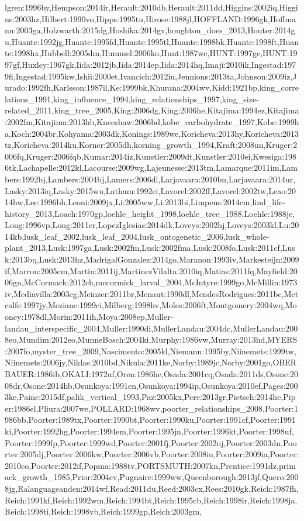 \documentclass[10pt,twoside]{article}\usepackage[]{graphicx}\usepackage[]{color}
\begin{document}
lgren:1996by,Hempson:2014ir,Herault:2010db,Herault:2011dd,Higgins:2002iq,Higgins:2003hz,Hilbert:1990vo,Hipps:1995tu,Hirose:1988jl,HOFFLAND:1996gk,Hoffmann:2003ga,Holzwarth:2015dg,Hoshika:2014gv,houghton_does_2013,Houter:2014gu,Huante:1992jg,Huante:1995fd,Huante:1995tl,Huante:1998bk,Huante:1998ft,Huante:1998hx,Hubbell:2005dm,Hummel:2006ko,Hunt:1987wc,HUNT:1997ge,HUNT:1997gf,Huxley:1967gk,Iida:2012jb,Iida:2014ep,Iida:2014hq,Imaji:2010ik,Ingestad:1979fi,Ingestad:1995kw,Ishii:2000et,Ivancich:2012iu,Jennions:2013ta,Johnson:2009iz,Jurado:1992fh,Karlsson:1987il,Ke:1999bk,Khurana:2004wv,Kidd:1921bp,king_correlations_1991,king_influence_1994,king_relationships_1997,king_size-related_2011,king_tree_2005,King:2006dg,King:2006he,Kitajima:1994ez,Kitajima:2002fm,Kitajima:2013hb,Kneeshaw:2006bd,kobe_carbohydrate_1997,Kobe:1999ha,Koch:2004br,Kohyama:2003dk,Konings:1989we,Koricheva:2013hy,Koricheva:2013tz,Koricheva:2014ku,Korner:2005dh,korning_growth_1994,Kraft:2008un,Kruger:2006fq,Kruger:2006fqb,Kumar:2014iz,Kunstler:2009dt,Kunstler:2010ei,Kwesiga:1986tk,Lachapelle:2012kl,Lacourse:2009wg,Lajeunesse:2013tm,Lamarque:2011im,Lambers:1992bj,Lambers:2004bj,Lamers:2006dl,Larjavaara:2010bn,Larjavaara:2014ur,Lasky:2013iq,Lasky:2015wu,Latham:1992ei,Lavorel:2002ff,Lavorel:2002tw,Leao:2014hw,Lee:1996bh,Leoni:2009jx,Li:2005ww,Li:2013bi,Limpens:2014cm,lind_life-history_2013,Loach:1970gp,loehle_height_1998,loehle_tree_1988,Loehle:1988je,Long:1996vp,Long:2011er,LopezIglesias:2014dk,Loveys:2002hj,Loveys:2003kl,Lu:2014kb,lusk_leaf_2002,lusk_leaf_2004,lusk_ontogenetic_2006,lusk_whole-plant_2013,Lusk:1997ga,Lusk:2002fm,Lusk:2002fma,Lusk:2008fo,Lusk:2011cf,Lusk:2013bq,Lusk:2013hz,MadrigalGonzalez:2014go,Maranon:1993iv,Markesteijn:2009if,Marron:2005cm,Martin:2011ij,MartinezVilalta:2010iq,Matias:2011fq,Mayfield:2006gn,McCormack:2012ch,mccormick_larval_2004,McIntyre:1999go,McMillin:1973iv,Mediavilla:2003cg,Meinzer:2011br,Menaut:1990dl,MendesRodrigues:2011bc,Metcalfe:1997jy,Meziane:1999ci,Milberg:1998hv,Moles:2006ft,Montgomery:2004wq,Mooney:1978dl,Morin:2011ih,Moya:2008ep,Muller-landau_interspecific_2004,Muller:1990di,MullerLandau:2004dc,MullerLandau:2008eo,Mundim:2012eo,MunneBosch:2004ki,Murphy:1986vw,Murray:2013hd,MYERS:2007fo,myster_tree_2009,Nascimento:2005kl,Niemann:1995by,Niinemets:1999tw,Niinemets:2006jy,Niklas:2010bd,Nikula:2011ke,Norby:1989jc,Norby:2001go,OBERBAUER:1986ib,OKALI:1972uf,Oren:1986he,Osada:2001cq,Osada:2011ds,Osone:2008dr,Osone:2014hb,Osunkoya:1991en,Osunkoya:1994ip,Osunkoya:2010ef,Pages:2003ke,Paine:2015df,palik_vertical_1993,Paz:2005kx,Pere:2013gr,Pietsch:2014he,Piper:1986el,Pliura:2007we,POLLARD:1968wv,poorter_relationships_2008,Poorter:1986bb,Poorter:1989tx,Poorter:1990bt,Poorter:1990ku,Poorter:1991cf,Poorter:1991ki,Poorter:1992hg,Poorter:1994em,Poorter:1995jn,Poorter:1996kt,Poorter:1998uf,Poorter:1999fp,Poorter:1999wd,Poorter:2001fj,Poorter:2002uj,Poorter:2003dn,Poorter:2005dj,Poorter:2006kw,Poorter:2006vb,Poorter:2008iu,Poorter:2009ia,Poorter:2010co,Poorter:2012if,Popma:1988tv,PORTSMUTH:2007kn,Prentice:1991dz,primack_growth_1985,Prior:2004cv,Pugnaire:1999ww,Queenborough:2013jf,Quero:2008jg,Ralanguageanden:2014wf,Read:2011du,Reed:2003cx,Rees:2010gk,Reich:1987fh,Reich:1991kf,Reich:1992wm,Reich:1994bt,Reich:1995cb,Reich:1998ir,Reich:1998ja,Reich:1998ti,Reich:1998vb,Reich:1999gp,Reich:2003gm,
\end{document}

